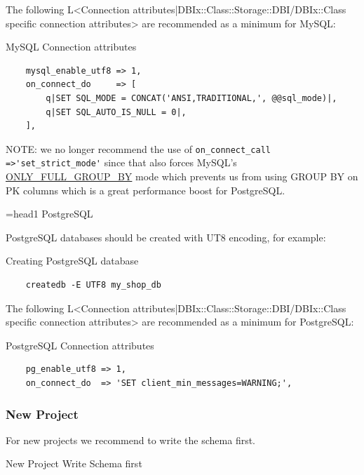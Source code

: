The following L<Connection attributes|DBIx::Class::Storage::DBI/DBIx::Class specific connection attributes> are recommended as a minimum for MySQL:

\begin{frame}[fragile]{MySQL Connection attributes}
\begin{lstlisting}
    mysql_enable_utf8 => 1,
    on_connect_do     => [
        q|SET SQL_MODE = CONCAT('ANSI,TRADITIONAL,', @@sql_mode)|,
        q|SET SQL_AUTO_IS_NULL = 0|,
    ],
\end{lstlisting}
\end{frame}

NOTE: we no longer recommend the use of 
\verb|on_connect_call =>'set_strict_mode'| since that also forces MySQL's 
\href{https://dev.mysql.com/doc/refman/5.0/en/sql-mode.html#sqlmode\_only\_full\_group\_by}{ONLY\_FULL\_GROUP\_BY} mode which prevents us from using GROUP BY on PK columns which is a great performance boost for PostgreSQL.

=head1 PostgreSQL

PostgreSQL databases should be created with UT8 encoding, for example:

\begin{frame}[fragile]{Creating PostgreSQL database}
\begin{lstlisting}
    createdb -E UTF8 my_shop_db
\end{lstlisting}
\end{frame}

The following L<Connection attributes|DBIx::Class::Storage::DBI/DBIx::Class specific connection attributes> are recommended as a minimum for PostgreSQL:

\begin{frame}[fragile]{PostgreSQL Connection attributes}
\begin{lstlisting}
    pg_enable_utf8 => 1,
    on_connect_do  => 'SET client_min_messages=WARNING;',
\end{lstlisting}
\end{frame}

\subsubsection{New Project}

For new projects we recommend to write the schema first.

\begin{frame}[fragile]{New Project}
Write Schema first
\end{frame}
 
